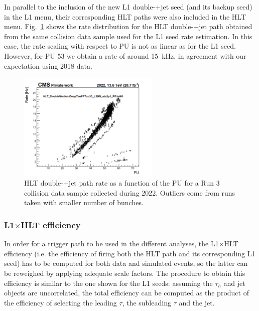 \documentclass[../main.tex]{subfiles}
\begin{document}
In parallel to the inclusion of the new L1 double-\tauh{}+jet seed (and its backup seed) in the L1 menu, their corresponding HLT paths were also included in the HLT menu. Fig.~\ref{hh:fig:hlt_rate_run3} shows the rate distribution for the HLT double-\tauh{}+jet path obtained from the same collision data sample used for the L1 seed rate estimation. In this case, the rate scaling with respect to PU is not as linear as for the L1 seed. However, for PU 53 we obtain a rate of around 15~kHz, in agreement with our expectation using 2018 data.

\begin{figure}[h!]
\begin{center}
\includegraphics[width=0.6\textwidth]{Images/HLT_rate}
\end{center}
\caption{HLT double-\tauh{}+jet path rate as a function of the PU for a Run 3 collision data sample collected during 2022.  Outliers come from runs taken with smaller number of bunches.}
\label{hh:fig:hlt_rate_run3}
\end{figure}

\subsubsection{L1$\times$HLT efficiency}

In order for a trigger path to be used in the different analyses, the L1$\times$HLT efficiency (i.e. the efficiency of firing both the HLT path and its corresponding L1 seed) has to be computed for both data and simulated events, so the latter can be reweighed by applying adequate scale factors. The procedure to obtain this efficiency is similar to the one shown for the L1 seeds: assuming the $\tau_h$ and jet objects are uncorrelated, the total efficiency can be computed as the product of the efficiency of selecting the leading $\tau$, the subleading $\tau$ and the jet.
\end{document}
